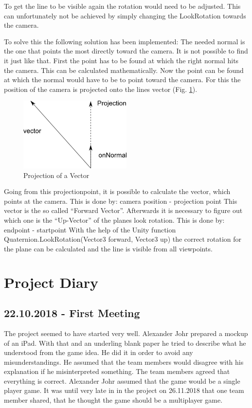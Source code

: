 To get the line to be visible again the rotation would need to be adjusted. This can unfortunately not be achieved by simply changing the LookRotation towards the camera.






To solve this the following solution has been implemented:
The needed normal is the one that points the most directly toward the camera.
It is not possible to find it just like that. First the point has to be found at which the right normal hits the camera.
This can be calculated mathematically.
Now the point can be found at which the normal would have to be to point toward the camera.
For this the position of the camera is projected onto the lines vector (Fig. \ref{fig:Projection}).
\begin{figure}[htbp]
	\centering
		\includegraphics[width=0.50\textwidth]{img/Projection.jpg}
	\caption[Projection of a Vector]{Projection of a Vector}
	\label{fig:Projection}
\end{figure}
Going from this projectionpoint, it is possible to calculate the vector, which points at the camera. This is done by:
camera position - projection point
This vector is the so called “Forward Vector”. Afterwards it is necessary to figure out which one is the “Up-Vector” of the planes look rotation. This is done by:
endpoint - startpoint
With the help of the Unity function Quaternion.LookRotation(Vector3 forward, Vector3 up) the correct rotation for the plane can be calculated and the line is visible from all viewpoints.

\section{Project Diary}

\subsection{22.10.2018 - First Meeting}

The project seemed to have started very well. Alexander Johr prepared a mockup of an iPad. With that and an underling blank paper he tried to describe what he understood from the game idea. He did it in order to avoid any misunderstandings. He assumed that the team members would disagree with his explanation if he misinterpreted something. The team members agreed that everything is correct. Alexander Johr assumed that the game would be a single player game. It was until very late in in the project on 26.11.2018 that one team member shared, that he thought the game should be a multiplayer game.

